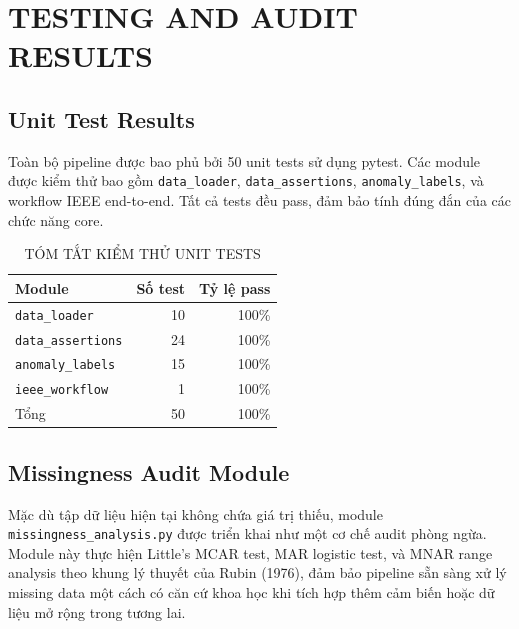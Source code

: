 \documentclass[conference]{IEEEtran}
\begin{document}
\section{TESTING AND AUDIT RESULTS}
\label{app:tests}

\subsection{Unit Test Results}

Toàn bộ pipeline được bao phủ bởi 50 unit tests sử dụng pytest.
Các module được kiểm thử bao gồm \texttt{data\_loader}, \texttt{data\_assertions}, \texttt{anomaly\_labels}, và workflow IEEE end-to-end.
Tất cả tests đều pass, đảm bảo tính đúng đắn của các chức năng core.

\begin{table}[htbp]
\caption{TÓM TẮT KIỂM THỬ UNIT TESTS}
\label{tab:tests}
\centering
\small
\begin{tabular}{@{}lrr@{}}
\toprule
Module & Số test & Tỷ lệ pass \\
\midrule
\texttt{data\_loader} & 10 & 100\% \\
\texttt{data\_assertions} & 24 & 100\% \\
\texttt{anomaly\_labels} & 15 & 100\% \\
\texttt{ieee\_workflow} & 1 & 100\% \\
\midrule
Tổng & 50 & 100\% \\
\bottomrule
\end{tabular}
\end{table}

\subsection{Missingness Audit Module}

Mặc dù tập dữ liệu hiện tại không chứa giá trị thiếu,
module \texttt{missingness\_analysis.py} được triển khai như một cơ chế audit phòng ngừa.
Module này thực hiện Little's MCAR test, MAR logistic test, và MNAR range analysis
theo khung lý thuyết của Rubin (1976),
đảm bảo pipeline sẵn sàng xử lý missing data một cách có căn cứ khoa học
khi tích hợp thêm cảm biến hoặc dữ liệu mở rộng trong tương lai.

\end{document}
